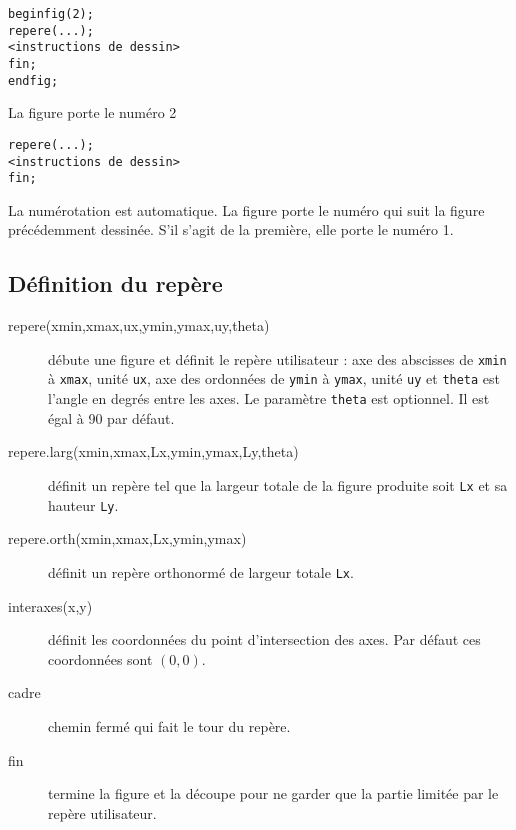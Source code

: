 \documentclass[11pt,a4paper,french]{article}
\begin{document}
\bigskip
\begin{minipage}[c]{0.3\linewidth}
\begin{lstlisting}[frame=single,frameround=tttt,backgroundcolor=\color{LightGoldenrod}]
beginfig(2);
repere(...);
<instructions de dessin>
fin;
endfig;
\end{lstlisting}
\end{minipage}
\hfill
\begin{minipage}[c]{0.6\linewidth}
La figure porte le numéro 2
\end{minipage}

\bigskip
\begin{minipage}[c]{0.3\linewidth}
\begin{lstlisting}[frame=single,frameround=tttt,backgroundcolor=\color{LightGoldenrod}]
repere(...);
<instructions de dessin>
fin;
\end{lstlisting}
\end{minipage}
\hfill
\begin{minipage}[c]{0.6\linewidth}
La numérotation est automatique. La figure porte le numéro qui suit la figure précédemment dessinée. S'il s'agit de la première, elle porte le numéro 1.
\end{minipage}



\subsection{Définition du repère}
\begin{description}
\item[repere(xmin,xmax,ux,ymin,ymax,uy,theta)] débute une figure et définit le repère utilisateur : axe des abscisses de \verb+xmin+ à \verb+xmax+, unité \verb+ux+, axe des ordonnées de \verb+ymin+ à \verb+ymax+, unité \verb+uy+ et \verb+theta+ est l'angle en degrés entre les axes. Le paramètre \verb+theta+ est optionnel. Il est égal à 90 par défaut.

\item[repere.larg(xmin,xmax,Lx,ymin,ymax,Ly,theta)] définit un repère tel que la largeur totale de la figure produite soit \verb+Lx+ et sa hauteur \verb+Ly+.

\item[repere.orth(xmin,xmax,Lx,ymin,ymax)] définit un repère orthonormé de largeur totale \verb+Lx+.

\item[interaxes(x,y)] définit les coordonnées du point d'intersection des axes. Par défaut ces coordonnées sont $(0,0)$.

\item[cadre] chemin fermé qui fait le tour du repère.

\item[fin] termine la figure et la découpe pour ne garder que la partie limitée par le repère utilisateur.
\end{description}
\end{document}
